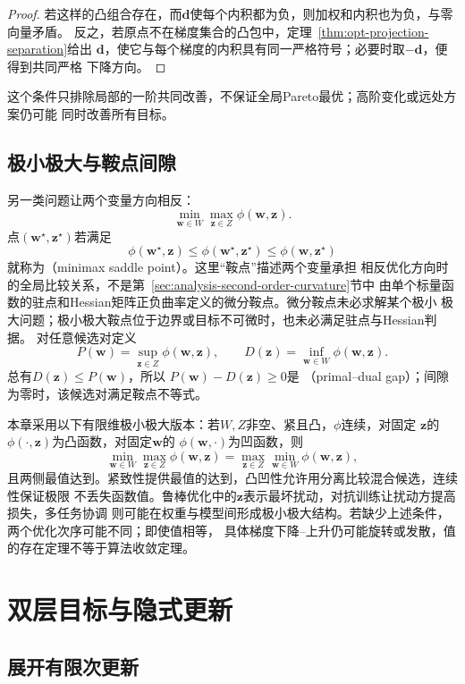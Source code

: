 \begin{proof}
若这样的凸组合存在，而$\bm{d}$使每个内积都为负，则加权和内积也为负，与零向量矛盾。
反之，若原点不在梯度集合的凸包中，定理~\ref{thm:opt-projection-separation}给出
$\bm{d}$，使它与每个梯度的内积具有同一严格符号；必要时取$-\bm{d}$，便得到共同严格
下降方向。
\end{proof}

这个条件只排除局部的一阶共同改善，不保证全局Pareto最优；高阶变化或远处方案仍可能
同时改善所有目标。

\subsection{极小极大与鞍点间隙}

另一类问题让两个变量方向相反：
\[
  \min_{\bm{w}\in W}\max_{\bm{z}\in Z}\phi(\bm{w},\bm{z}).
\]
点$(\bm{w}^{\star},\bm{z}^{\star})$若满足
\[
  \phi(\bm{w}^{\star},\bm{z})
  \leq\phi(\bm{w}^{\star},\bm{z}^{\star})
  \leq\phi(\bm{w},\bm{z}^{\star})
\]
就称为（minimax saddle point）。这里“鞍点”描述两个变量承担
相反优化方向时的全局比较关系，不是第~\ref{sec:analysis-second-order-curvature}节中
由单个标量函数的驻点和Hessian矩阵正负曲率定义的微分鞍点。微分鞍点未必求解某个极小
极大问题；极小极大鞍点位于边界或目标不可微时，也未必满足驻点与Hessian判据。
对任意候选对定义
\[
  P(\bm{w})=\sup_{\bm{z}\in Z}\phi(\bm{w},\bm{z}),\qquad
  D(\bm{z})=\inf_{\bm{w}\in W}\phi(\bm{w},\bm{z}).
\]
总有$D(\bm{z})\leq P(\bm{w})$，所以
$P(\bm{w})-D(\bm{z})\geq0$是
（primal--dual gap）；间隙为零时，该候选对满足鞍点不等式。

本章采用以下有限维极小极大版本：若$W,Z$非空、紧且凸，$\phi$连续，对固定
$\bm{z}$的$\phi(\cdot,\bm{z})$为凸函数，对固定$\bm{w}$的
$\phi(\bm{w},\cdot)$为凹函数，则
\[
  \min_{\bm{w}\in W}\max_{\bm{z}\in Z}\phi(\bm{w},\bm{z})
  =
  \max_{\bm{z}\in Z}\min_{\bm{w}\in W}\phi(\bm{w},\bm{z}),
\]
且两侧最值达到。紧致性提供最值的达到，凸凹性允许用分离比较混合候选，连续性保证极限
不丢失函数值。鲁棒优化中的$\bm{z}$表示最坏扰动，对抗训练让扰动方提高损失，多任务协调
则可能在权重与模型间形成极小极大结构。若缺少上述条件，两个优化次序可能不同；即使值相等，
具体梯度下降--上升仍可能旋转或发散，值的存在定理不等于算法收敛定理。

\section{双层目标与隐式更新}
\label{sec:opt-bilevel}

\subsection{展开有限次更新}

